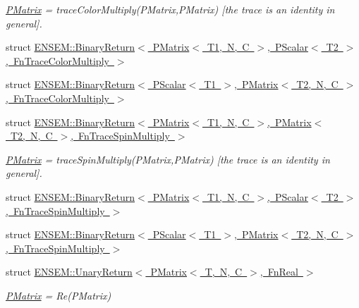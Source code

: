 \begin{DoxyCompactItemize}
\begin{DoxyCompactList}\small\item\em \mbox{\hyperlink{classENSEM_1_1PMatrix}{P\+Matrix}} = trace\+Color\+Multiply(\+P\+Matrix,\+P\+Matrix) \mbox{[}the trace is an identity in general\mbox{]}. \end{DoxyCompactList}\item 
struct \mbox{\hyperlink{structENSEM_1_1BinaryReturn_3_01PMatrix_3_01T1_00_01N_00_01C_01_4_00_01PScalar_3_01T2_01_4_00_01FnTraceColorMultiply_01_4}{E\+N\+S\+E\+M\+::\+Binary\+Return$<$ P\+Matrix$<$ T1, N, C $>$, P\+Scalar$<$ T2 $>$, Fn\+Trace\+Color\+Multiply $>$}}
\item 
struct \mbox{\hyperlink{structENSEM_1_1BinaryReturn_3_01PScalar_3_01T1_01_4_00_01PMatrix_3_01T2_00_01N_00_01C_01_4_00_01FnTraceColorMultiply_01_4}{E\+N\+S\+E\+M\+::\+Binary\+Return$<$ P\+Scalar$<$ T1 $>$, P\+Matrix$<$ T2, N, C $>$, Fn\+Trace\+Color\+Multiply $>$}}
\item 
struct \mbox{\hyperlink{structENSEM_1_1BinaryReturn_3_01PMatrix_3_01T1_00_01N_00_01C_01_4_00_01PMatrix_3_01T2_00_01N_00_27c89d09a7160e4b94859894ef7b979a}{E\+N\+S\+E\+M\+::\+Binary\+Return$<$ P\+Matrix$<$ T1, N, C $>$, P\+Matrix$<$ T2, N, C $>$, Fn\+Trace\+Spin\+Multiply $>$}}
\begin{DoxyCompactList}\small\item\em \mbox{\hyperlink{classENSEM_1_1PMatrix}{P\+Matrix}} = trace\+Spin\+Multiply(\+P\+Matrix,\+P\+Matrix) \mbox{[}the trace is an identity in general\mbox{]}. \end{DoxyCompactList}\item 
struct \mbox{\hyperlink{structENSEM_1_1BinaryReturn_3_01PMatrix_3_01T1_00_01N_00_01C_01_4_00_01PScalar_3_01T2_01_4_00_01FnTraceSpinMultiply_01_4}{E\+N\+S\+E\+M\+::\+Binary\+Return$<$ P\+Matrix$<$ T1, N, C $>$, P\+Scalar$<$ T2 $>$, Fn\+Trace\+Spin\+Multiply $>$}}
\item 
struct \mbox{\hyperlink{structENSEM_1_1BinaryReturn_3_01PScalar_3_01T1_01_4_00_01PMatrix_3_01T2_00_01N_00_01C_01_4_00_01FnTraceSpinMultiply_01_4}{E\+N\+S\+E\+M\+::\+Binary\+Return$<$ P\+Scalar$<$ T1 $>$, P\+Matrix$<$ T2, N, C $>$, Fn\+Trace\+Spin\+Multiply $>$}}
\item 
struct \mbox{\hyperlink{structENSEM_1_1UnaryReturn_3_01PMatrix_3_01T_00_01N_00_01C_01_4_00_01FnReal_01_4}{E\+N\+S\+E\+M\+::\+Unary\+Return$<$ P\+Matrix$<$ T, N, C $>$, Fn\+Real $>$}}
\begin{DoxyCompactList}\small\item\em \mbox{\hyperlink{classENSEM_1_1PMatrix}{P\+Matrix}} = Re(\+P\+Matrix) \end{DoxyCompactList}\item 

\end{DoxyCompactItemize}
